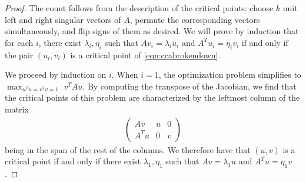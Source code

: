 \documentclass[10pt,a4paper]{amsart}
\begin{document}
\begin{proof}
    The count follows from the description of the critical points: choose $k$ unit left and right singular vectors of $A$, permute the corresponding vectors simultaneously, and flip  signs of them as desired. 
    We will prove by induction that for each $i$, there exist $\lambda_i, \eta_i$ such that $Av_i = \lambda_i u_i$ and $A^T u_i = \eta_i v_i$ if and only if the pair $(u_i, v_i)$ is a critical point of \eqref{eqn:ccabrokendown}. 
    
    We proceed by induction on $i$.
    When $i = 1$, the optimization problem simplifies to 
    $\max_{u^Tu = v^Tv = 1} \,\, v^TAu.$
    By computing the transpose of the Jacobian, we find that the critical points of this problem are characterized by the leftmost column of the matrix
    \begin{align*}
        \begin{pmatrix}
            Av & u & 0\\
            A^T u & 0  & v
        \end{pmatrix}
    \end{align*}
    being in the span of the rest of the columns. 
    We therefore have that $(u,v)$ is a critical point if and only if there exist $\lambda_1, \eta_1$ such that $Av = \lambda_1 u$ and $A^Tu = \eta_1 v$. 


\end{proof}
\end{document}

